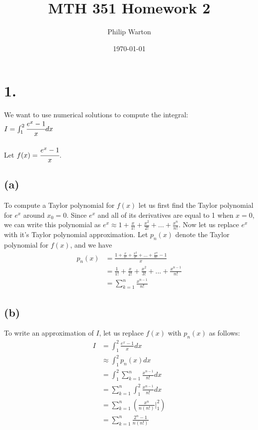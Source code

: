 \documentclass{article}
\begin{document}
\title{MTH 351 Homework 2}
\author{Philip Warton}
\date{\today}
\maketitle

\section*{1.}
	We want to use numerical solutions to compute the integral:\\ 
	$I = \int_1^2\cfrac{e^x-1}{x}dx$\\\\
	Let $f(x) = \cfrac{e^x-1}{x}$.
	\subsection*{(a)}
		To compute a Taylor polynomial for $f(x)$ let us first find the Taylor polynomial for $e^x$ around $x_0 = 0$.
		Since $e^x$ and all of its derivatives are equal to 1 when $x = 0$, we can write this polynomial as $e^x \approx 1 + \frac{x}{1!} + \frac{x^2}{2!} + ... + \frac{x^n}{n!}$.
		Now let us replace $e^x$ with it's Taylor polynomial approximation.
		Let $p_n(x)$ denote the Taylor polynomial for $f(x)$, and we have
		\begin{align*}
			p_n(x) & = \frac{1 + \frac{x}{1!} + \frac{x^2}{2!} + ... + \frac{x^n}{n!} -1}{x} \\
			& = \frac{1}{1!} + \frac{x}{2!} + \frac{x^2}{3!} + ... + \frac{x^{n-1}}{n!} \\
			& = \sum_{k=1}^{n} \frac{x^{n-1}}{n!}
		\end{align*}
	\subsection*{(b)}
		To write an approximation of $I$, let us replace $f(x)$ with $p_n(x)$ as follows:
		\begin{align*}
			I & = \int_1^2\frac{e^x-1}{x}dx\\
			& \approx \int_1^2 p_n(x)dx\\
			& = \int_1^2 \sum_{k=1}^{n} \frac{x^{n-1}}{n!} dx \\
			& = \sum_{k=1}^{n} \int_1^2 \frac{x^{n-1}}{n!} dx \\
			& = \sum_{k=1}^{n} (\frac{x^n}{n(n!)}\bigg|_1^2) \\
			& = \sum_{k=1}^{n} \frac{2^n-1}{n(n!)}
		\end{align*}
\end{document}
